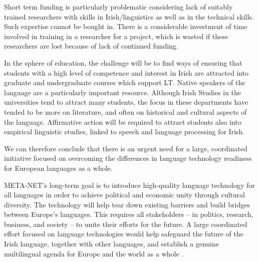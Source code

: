 \begin{multicols}{2}
Short term funding is particularly problematic considering lack of suitably trained researchers with skills in Irish/linguistics as well as in the technical skills. Such expertise cannot be bought in. There is a considerable investment of time involved in training in a researcher for a project, which is wasted if these researchers are lost because of lack of continued funding. 

In the sphere of education, the challenge will be to find ways of ensuring that students with a high level of competence and interest in Irish are attracted into graduate and undergraduate courses which support LT. Native speakers of the language are a particularly important resource. Although Irish Studies in the universities tend to attract many students, the focus in these departments have tended to be more on literature, and often on historical  and cultural aspects of the language. Affirmative action will be required to attract students also into empirical linguistic studies, linked to speech and language processing for Irish.




\label{fig:EuromapHLT_en}


We can therefore conclude that there is an urgent need for a large, coordinated initiative focused on overcoming the differences in language technology readiness for European languages as a whole.

META-NET’s long-term goal is to introduce high-quality language technology for all languages in order to achieve political and economic unity through cultural diversity. The technology will help tear down existing barriers and build bridges between Europe’s languages. This requires all stakeholders -- in politics, research, business, and society -- to unite their efforts for the future. A large coordinated effort focused on language technologies would help safeguard the future of the Irish language, together with other languages, and establish a genuine multilingual agenda for Europe and the world as a whole \cite{tcstar}. 




\end{multicols}
